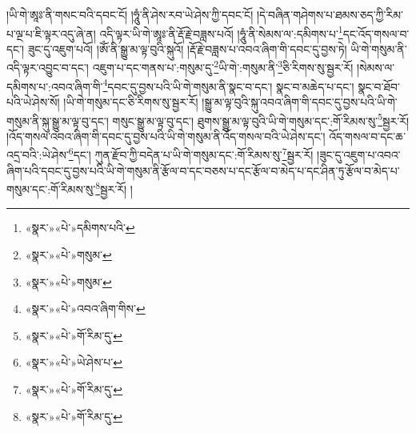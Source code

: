 །ཡི་གེ་ཨཱཿ་ནི་གསང་བའི་དབང་ངོ། །ཧཱུཾ་ནི་ཤེས་རབ་ཡེ་ཤེས་ཀྱི་དབང་ངོ། །དེ་བཞིན་གཤེགས་པ་ཐམས་ཅད་ཀྱི་རིམ་པ་ལྔ་པ་ཇི་ལྟར་འདུ་ཞེ་ན། འདི་ལྟར་ཡི་གེ་ཨཱཿ་ནི་རྡོ་རྗེ་བཟླས་པའོ། །ཧཱུཾ་ནི་སེམས་ལ་:དམིགས་པ་\footnote{«སྣར་»«པེ་»དམིགས་པའི་}དང་འོད་གསལ་བ་དང་། ཟུང་དུ་འཇུག་པའོ། །ཨོཾ་ནི་སྒྱུ་མ་ལྟ་བུའི་སྐུའོ། །རྡོ་རྗེ་བཟླས་པ་འབའ་ཞིག་གི་དབང་དུ་བྱས་ཏེ། ཡི་གེ་གསུམ་ནི་འདི་ལྟར་འབྱུང་བ་དང་། འཇུག་པ་དང་གནས་པ་:གསུམ་དུ་\footnote{«སྣར་»«པེ་»གསུམ་}ཡི་གེ་:གསུམ་ནི་\footnote{«སྣར་»«པེ་»གསུམ་}ཅི་རིགས་སུ་སྦྱར་རོ། །སེམས་ལ་དམིགས་པ་:འབའ་ཞིག་གི་\footnote{«སྣར་»«པེ་»འབའ་ཞིག་གིས་}དབང་དུ་བྱས་པའི་ཡི་གེ་གསུམ་ནི་སྣང་བ་དང་། སྣང་བ་མཆེད་པ་དང་། སྣང་བ་ཐོབ་པའི་ཡེ་ཤེས་སོ། །ཡི་གེ་གསུམ་དང་ཅི་རིགས་སུ་སྦྱར་རོ། །སྒྱུ་མ་ལྟ་བུའི་སྐུ་འབའ་ཞིག་གི་དབང་དུ་བྱས་པའི་ཡི་གེ་གསུམ་ནི་སྐུ་སྒྱུ་མ་ལྟ་བུ་དང་། གསུང་སྒྱུ་མ་ལྟ་བུ་དང་། ཐུགས་སྒྱུ་མ་ལྟ་བུའི་ཡི་གེ་གསུམ་དང་:གོ་རིམས་སུ་\footnote{«སྣར་»«པེ་»གོ་རིམ་དུ་}སྦྱར་རོ། །འོད་གསལ་འབའ་ཞིག་གི་དབང་དུ་བྱས་པའི་ཡི་གེ་གསུམ་ནི་འོད་གསལ་བའི་ཡེ་ཤེས་དང་། འོད་གསལ་བ་དང་ཆ་འདྲ་བའི་:ཡེ་ཤེས་\footnote{«སྣར་»«པེ་»ཡེ་ཤེས་པ་}དང་། ཀུན་རྫོབ་ཀྱི་བདེན་པ་ཡི་གེ་གསུམ་དང་:གོ་རིམས་སུ་\footnote{«སྣར་»«པེ་»གོ་རིམ་དུ་}སྦྱར་རོ། །ཟུང་དུ་འཇུག་པ་འབའ་ཞིག་པའི་དབང་དུ་བྱས་པའི་ཡི་གེ་གསུམ་ནི་རྩོལ་བ་དང་བཅས་པ་དང་རྩོལ་བ་མེད་པ་དང་ཤིན་ཏུ་རྩོལ་བ་མེད་པ་གསུམ་དང་:གོ་རིམས་སུ་\footnote{«སྣར་»«པེ་»གོ་རིམ་དུ་}སྦྱར་རོ། །
